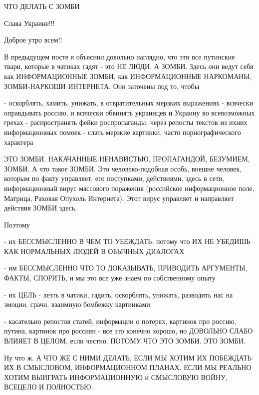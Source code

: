  
 
 
 
 

ЧТО ДЕЛАТЬ С ЗОМБИ

Слава Украине!!! 💛 💙 💛 💙 💛 💙

Доброе утро всем!!

В предыдущем посте я объяснил довольно наглядно, что эти все путинские твари,
которые в чатиках гадят - это НЕ ЛЮДИ, А ЗОМБИ. Здесь они ведут себя как
ИНФОРМАЦИОННЫЕ ЗОМБИ, как ИНФОРМАЦИОННЫЕ НАРКОМАНЫ, ЗОМБИ-НАРКОШИ ИНТЕРНЕТА.
Они заточены под то, чтобы

- оскорблять, хамить, унижать, в отвратительных мерзких выражениях
- всячески оправдывать россию, и всячески обвинять украинцев и Украину
во всевозможных грехах
- распространять фейки роспропаганды, через репосты текстов из ихних информационных помоек
- слать мерзкие картинки, часто порнографического характера 

ЭТО ЗОМБИ. НАКАЧАННЫЕ НЕНАВИСТЬЮ, ПРОПАГАНДОЙ, БЕЗУМИЕМ, ЗОМБИ. А что такое
ЗОМБИ. Это человеко-подобная особь, внешне человек, которым по факту управляет,
его поступками, действиями, здесь в сети, информационный вирус массового
поражения (российское информационное поле, Матрица, Раховая Опухоль Интернета).
Этот вирус управляет и направляет действия ЗОМБИ здесь. 

Поэтому

- их БЕССМЫСЛЕННО В ЧЕМ ТО УБЕЖДАТЬ, потому что ИХ НЕ УБЕДИШЬ КАК НОРМАЛЬНЫХ
ЛЮДЕЙ В ОБЫЧНЫХ ДИАЛОГАХ

- им БЕССМЫСЛЕННО ЧТО ТО ДОКАЗЫВАТЬ, ПРИВОДИТЬ АРГУМЕНТЫ, ФАКТЫ, СПОРИТЬ, и мы
это все уже знаем по собственному опыту

- их ЦЕЛЬ - лезть в чатики, гадить, оскорблять, унижать, разводить нас на
эмоции, срачи, взаимную бомбежку картинками

- касательно репостов статей, информации о потерях, картинок про россию,
путина, картинок про россиян - все это конечно хорошо, но ДОВОЛЬНО СЛАБО ВЛИЯЕТ
В ЦЕЛОМ, если честно. ПОТОМУ ЧТО ЭТО ЗОМБИ. ЭТО ЗОМБИ.

Ну что ж. А ЧТО ЖЕ С НИМИ ДЕЛАТЬ, ЕСЛИ МЫ ХОТИМ ИХ ПОБЕЖДАТЬ ИХ В СМЫСЛОВОМ,
ИНФОРМАЦИОННОМ ПЛАНАХ. ЕСЛИ МЫ РЕАЛЬНО ХОТИМ ВЫИГРАТЬ ИНФОРМАЦИОННУЮ и
СМЫСЛОВУЮ ВОЙНУ, ВСЕЦЕЛО И ПОЛНОСТЬЮ.

